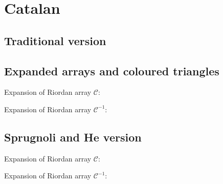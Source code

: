 \documentclass[11pt,a4paper]{article} %
\begin{document}
    \section{Catalan}

    \subsection{Traditional version}



    \subsection{Expanded arrays and coloured triangles}

    Expansion of Riordan array $\mathcal{C}$:
    
    Expansion of Riordan array $\mathcal{C}^{-1}$:
    

    
    

    \subsection{Sprugnoli and He version}

    Expansion of Riordan array $\mathcal{C}$:
    
    Expansion of Riordan array $\mathcal{C}^{-1}$:
    

    
    
    
    
\end{document}
